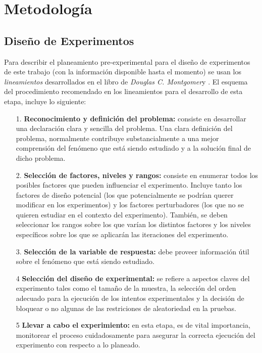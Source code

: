 \section{\textbf{Metodolog\'ia}}
\subsection{Dise\~no de Experimentos}
Para describir el planeamiento pre-experimental para el dise\~no de experimentos de este trabajo (con la informaci\'on disponible hasta el momento) se usan los \textit{lineamientos} desarrollados en el libro de \textit{Douglas C. Montgomer}y \cite{montgomeryx}. El esquema del procedimiento recomendado en los lineamientos para el desarrollo de esta etapa, incluye lo siguiente:
\begin{itemize}
\item [1.] \textbf{Reconocimiento y definici\'on del problema:} consiste en desarrollar una declaraci\'on clara y sencilla del problema. Una clara definici\'on del problema, normalmente contribuye substancialmente a una mejor comprensi\'on del fen\'omeno que est\'a siendo estudiado y a la soluci\'on final de dicho problema.
\item [2.] \textbf{Selecci\'on de factores, niveles y rangos:} consiste en enumerar todos los posibles factores que pueden influenciar el experimento. Incluye tanto los factores de dise\~no potencial (los que potencialmente se podr\'ian querer modificar en los experimentos) y los factores perturbadores (los que no se quieren estudiar en el contexto del experimento). Tambi\'en, se deben seleccionar los rangos sobre los que var\'ian los distintos factores y los niveles espec\'ificos sobre los que se aplicar\'an las iteraciones del experimento.
\item [3.] \textbf{Selecci\'on de la variable de respuesta:} debe proveer informaci\'on \'util sobre el fen\'omeno que est\'a siendo estudiado.
\item [4] \textbf{Selecci\'on del dise\~no de experimental:} se refiere a aspectos claves del experimento tales como el tama\~no de la muestra, la selecci\'on del orden adecuado para la ejecuci\'on de los intentos experimentales y la decisi\'on de bloquear o no algunas de las restriciones de aleatoriedad en la pruebas.
\item [5] \textbf{Llevar a cabo el experimiento:} en esta etapa, es de vital importancia, monitorear el proceso cuidadosamente para asegurar la correcta ejecuci\'on del expe\-rimento con respecto a lo planeado.
\end{itemize}
